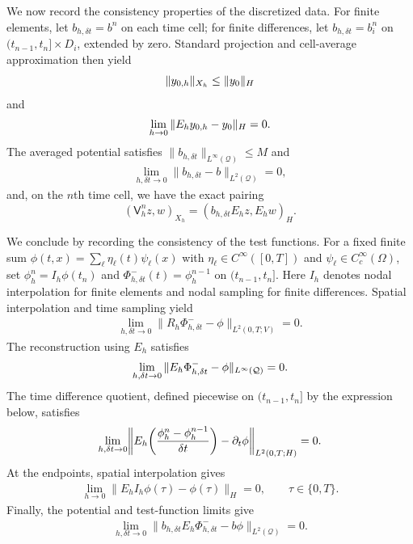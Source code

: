\documentclass[print,wide,eng]{draft}
\begin{document}
We now record the consistency properties of the discretized data. For finite elements, let $b_{h,\delta t}=b^n$ on each time cell; for finite differences, let $b_{h,\delta t}=b_i^n$ on $(t_{n-1},t_n]\times D_i$, extended by zero. Standard projection and cell-average approximation then yield\vspace{-2mm}
$$
\|y_{0,h}\|_{X_h}\le\|y_0\|_H\vspace{-2mm}
$$
and\vspace{-2mm}
%
\begin{align}\label{eq:conv-data-consistency}
\lim_{h\to0}\|E_hy_{0,h}-y_0\|_H=0.\vspace{-1mm}
\end{align}
%
The averaged potential satisfies $\|b_{h,\delta t}\|_{L^\infty(\mathcal Q)}\le M$ and
%
\begin{align}\label{eq:conv-potential-consistency}
\lim_{h,\delta t\to0}\|b_{h,\delta t}-b\|_{L^2(\mathcal Q)}=0,
\end{align}
%
and, on the $n$th time cell, we have the exact pairing
$$
(\mathsf V_h^nz,w)_{X_h}=(b_{h,\delta t}E_hz,E_hw)_H.
$$

We conclude by recording the consistency of the test functions. For a fixed finite sum $\phi(t,x)=\sum_\ell\eta_\ell(t)\psi_\ell(x)$ with $\eta_\ell\in C^\infty([0,T])$ and $\psi_\ell\in C_c^\infty(\Omega)$, set $\phi_h^n=I_h\phi(t_n)$ and $\Phi_{h,\delta t}^-(t)=\phi_h^{n-1}$ on $(t_{n-1},t_n]$. Here $I_h$ denotes nodal interpolation for finite elements and nodal sampling for finite differences. Spatial interpolation and time sampling yield
%
\begin{align}\label{eq:conv-test-consistency}
\lim_{h,\delta t\to0}\|R_h\Phi_{h,\delta t}^--\phi\|_{L^2(0,T;V)}=0.
\end{align}
%
The reconstruction using $E_h$ satisfies\vspace{-2mm}
%
\begin{align*}
\lim_{h,\delta t\to0}\|E_h\Phi_{h,\delta t}^--\phi\|_{L^\infty(\mathcal Q)}=0.\vspace{-2mm}
\end{align*}
%
The time difference quotient, defined piecewise on $(t_{n-1},t_n]$ by the expression below, satisfies\vspace{-2mm}
%
\begin{align*}
\lim_{h,\delta t\to0}
\biggl\|E_h\biggl(\frac{\phi_h^n-\phi_h^{n-1}}{\delta t}\biggr)
-\partial_t\phi\biggr\|_{L^2(0,T;H)}=0.\vspace{-2mm}
\end{align*}
%
At the endpoints, spatial interpolation gives
\begin{align*}
\lim_{h\to0}\|E_hI_h\phi(\tau)-\phi(\tau)\|_H=0,
\qquad \tau\in\{0,T\}.
\end{align*}
Finally, the potential and test-function limits give
\begin{align*}
\lim_{h,\delta t\to0}\|b_{h,\delta t}E_h\Phi_{h,\delta t}^--b\phi\|_{L^2(\mathcal Q)}=0.
\end{align*}
\end{document}
